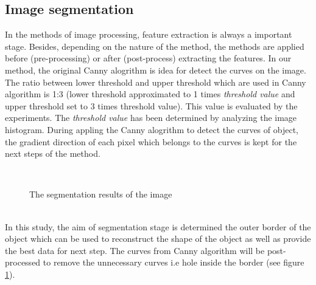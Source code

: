 \documentclass[twoside,twocolumn,10pt]{article}
\begin{document}
\subsection{Image segmentation}
In the methods of image processing, feature extraction is always a
important stage. Besides, depending on the nature of the method, the
methods are applied before (pre-processing) or after (post-process)
extracting the features. In our method, the original Canny
alogrithm\cite{canny1986computational} is idea for detect the curves on the image. The
ratio between lower threshold and upper threshold which are used in
Canny algorithm is 1:3 (lower threshold approximated to 1 times
\textit{threshold value} and upper threshold set to 3 times threshold
value). This value is evaluated by the experiments. The
\textit{threshold value} has been determined by analyzing the image
histogram. During appling the Canny alogrithm to detect the curves of
object, the gradient direction of each pixel which belongs to the
curves is kept for the next steps of the method.

\begin{figure}[h]
\centering
{}~~ 
\caption{The segmentation results of the image}
\label{canny}
\end{figure}~\\
In this study, the aim of segmentation stage is determined the outer
border of the object which can be used to reconstruct the shape of the
object as well as provide the best data for next step. The curves from
Canny algorithm will be post-processed to remove the unnecessary
curves i.e hole inside the border (see figure \ref{canny}).
\end{document}
